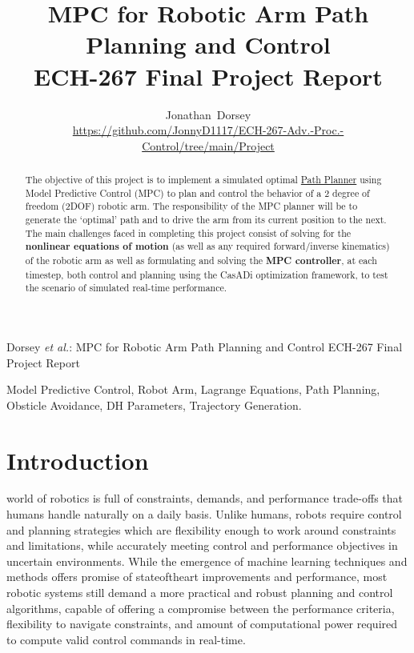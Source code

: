 \documentclass[journal]{IEEEtran}
\begin{document}
\title{MPC for Robotic Arm Path Planning and Control \\ ECH-267 Final Project Report}


\author{Jonathan~Dorsey  \\  \url{https://github.com/JonnyD1117/ECH-267-Adv.-Proc.-Control/tree/main/Project}}


%
{Dorsey \MakeLowercase{\textit{et al.}}: MPC for Robotic Arm Path Planning and Control ECH-267 Final Project Report}

\maketitle

\begin{abstract}
  The objective of this project is to implement a simulated optimal \underline{Path Planner} using Model Predictive Control (MPC) to plan and control the behavior of a 2 degree of freedom (2DOF) robotic arm. The responsibility of the MPC planner will be to generate the `optimal' path and to drive the arm from its current position to the next. The main challenges faced in completing this project consist of solving for the \textbf{nonlinear equations of motion} (as well as any required forward/inverse kinematics) of the robotic arm as well as formulating and solving the \textbf{MPC controller}, at each timestep, both control and planning using the CasADi optimization framework, to test the scenario of simulated real-time performance.
\end{abstract}

\begin{IEEEkeywords}
Model Predictive Control, Robot Arm, Lagrange Equations, Path Planning, Obsticle Avoidance, DH Parameters, Trajectory Generation.
\end{IEEEkeywords}


\IEEEpeerreviewmaketitle

\section{Introduction}

 world of robotics is full of constraints, demands, and performance trade-offs that humans handle naturally on a daily basis. Unlike humans, robots require control and planning strategies which are flexibility enough to work around constraints and limitations, while accurately meeting control and performance objectives in uncertain environments. While the emergence of machine learning techniques and methods offers promise of stateoftheart improvements and performance, most robotic systems still demand a more practical and robust planning and control algorithms, capable of offering a compromise between the performance criteria, flexibility to navigate constraints, and amount of computational power required to compute valid control commands in real-time. \\
\end{document}
